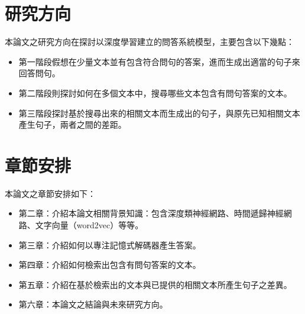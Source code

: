 \section{研究方向}
本論文之研究方向在探討以深度學習建立的問答系統模型，主要包含以下幾點：
\itemsep -2pt
\begin{itemize}
    \item 第一階段假想在少量文本並有包含符合問句的答案，進而生成出適當的句子來回答問句。
    \item 第二階段則探討如何在多個文本中，搜尋哪些文本包含有問句答案的文本。
    \item 第三階段探討基於搜尋出來的相關文本而生成出的句子，與原先已知相關文本產生句子，兩者之間的差距。
\end{itemize}

\section{章節安排}
本論文之章節安排如下：
\begin{itemize}
\itemsep -2pt
    \item 第二章：介紹本論文相關背景知識：包含深度類神經網路、時間遞歸神經網路、文字向量（word2vec）等等。
    \item 第三章：介紹如何以專注記憶式解碼器產生答案。
    \item 第四章：介紹如何檢索出包含有問句答案的文本。
    \item 第五章：介紹在基於檢索出的文本與已提供的相關文本所產生句子之差異。
    \item 第六章：本論文之結論與未來研究方向。
\end{itemize}
